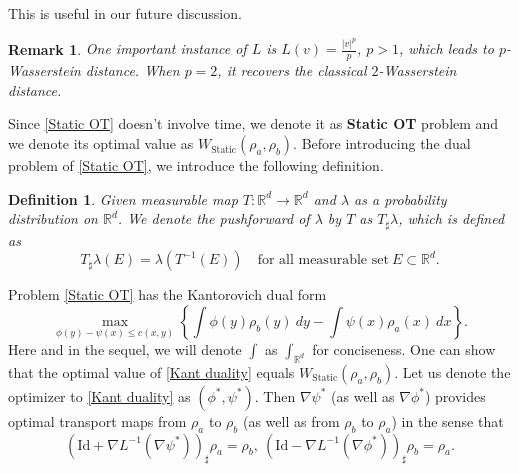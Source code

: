\documentclass{article}
\newtheorem{definition}{Definition}
\newtheorem{remark}{Remark}
\begin{document}
This is useful in our future discussion.
\begin{remark}
 One important instance of $L$ is $L(v)=\frac{|v|^p}{p}$, $p>1$, which leads to $p$-Wasserstein distance. When $p=2$, it recovers the classical $2$-Wasserstein distance.
\end{remark}
Since \eqref{Static OT} doesn't involve time, we denote it as \textbf{Static OT} problem and we denote its optimal value as $W_{\textrm{Static}}(\rho_a, \rho_b)$. Before introducing the dual problem of \eqref{Static OT}, we introduce the following definition.
\begin{definition}\label{pushfwd of distribution}
 Given measurable map $T:\mathbb{R}^d\rightarrow \mathbb{R}^d$ and $\lambda$ as a probability distribution on $\mathbb{R}^d$.  We denote the pushforward of $\lambda$ by $T$ as $T_{\sharp}\lambda$, which is defined as 
 \begin{equation*}
   T_{\sharp}\lambda(E) = \lambda(T^{-1}(E)) \quad  \textrm{for all measurable set} ~ E \subset \mathbb{R}^d.
 \end{equation*}
\end{definition}
Problem \eqref{Static OT} has the Kantorovich dual form \citep{villani2008optimal}
\begin{equation}
 \max_{\phi(y)-\psi(x)\leq c(x,y)}\left\{ \int \phi(y)\rho_b(y)~dy - \int \psi(x)\rho_a(x)~dx \right\} . \label{Kant duality}
\end{equation}
Here and in the sequel, we will denote $\int$ as $\int_{\mathbb{R}^d}$ for conciseness. One can show that the optimal value of \eqref{Kant duality} equals $W_{\textrm{Static}}(\rho_a, \rho_b)$. Let us denote the optimizer to \eqref{Kant duality} as $ (\phi^*,\psi^*)$.
Then $\nabla\psi^*$ (as well as $\nabla\phi^*$) provides optimal transport maps from $\rho_a$ to $\rho_b$ (as well as from $\rho_b$ to $\rho_a$) in the sense that
\begin{equation}
(\textrm{Id}+\nabla L^{-1}(\nabla\psi^*))_{\sharp}\rho_a=\rho_b, ~  %
(\textrm{Id}-\nabla L^{-1}(\nabla\phi^*))_{\sharp}\rho_b = \rho_a.  \label{phi, psi as monge maps}
\end{equation}
\end{document}
